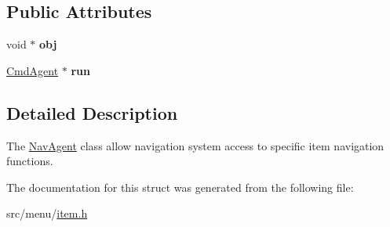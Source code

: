 \subsection*{Public Attributes}
\begin{DoxyCompactItemize}
\item 
\mbox{\label{structNavAgent_a5c9a3c69aa8811b13b8a1baab9e638d6}} 
void $\ast$ {\bfseries obj}
\item 
\mbox{\label{structNavAgent_a546c2683e672c82fdb3f9d1a3f444f94}} 
\hyperlink{structCmdAgent}{Cmd\+Agent} $\ast$ {\bfseries run}
\end{DoxyCompactItemize}


\subsection{Detailed Description}
The \hyperlink{structNavAgent}{Nav\+Agent} class allow navigation system access to specific item navigation functions. 

The documentation for this struct was generated from the following file\+:\begin{DoxyCompactItemize}
\item 
src/menu/\hyperlink{item_8h}{item.\+h}\end{DoxyCompactItemize}
